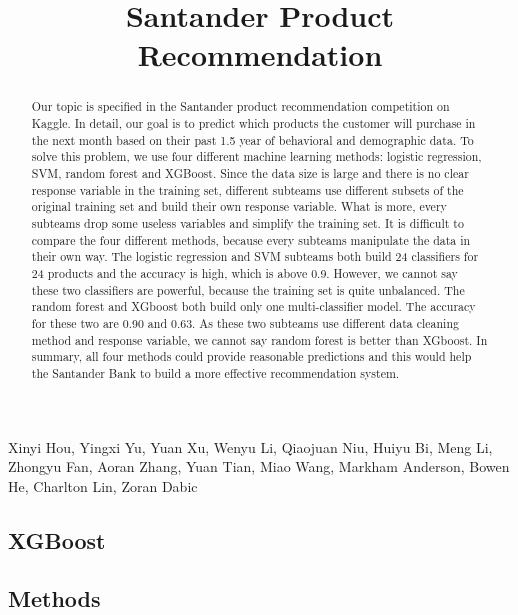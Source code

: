 \documentclass{article}
\title{Santander Product Recommendation}
\begin{document}
	\maketitle
	\begin{center}\begin{Large} Xinyi Hou,
			Yingxi Yu,
			Yuan Xu,
			Wenyu Li,
			Qiaojuan Niu,
			Huiyu Bi,
			Meng Li,
			Zhongyu Fan,
			Aoran Zhang,
			Yuan Tian,
			Miao Wang,
			Markham Anderson,
			Bowen He,
			Charlton Lin,
			Zoran Dabic \end{Large}\end{center}
	\begin{spacing}{1}
		\begin{large}
			
\begin{abstract}
	 Our topic is specified in the Santander product recommendation competition on Kaggle. In detail, our goal is to predict which products the customer will purchase in the next month based on their past 1.5 year of behavioral and demographic data. To solve this problem, we use four different machine learning methods: logistic regression, SVM, random forest and XGBoost. Since the data size is large and there is no clear response variable in the training set, different subteams use different subsets of the original training set and build their own response variable. What is more, every subteams drop some useless variables and simplify the training set. It is difficult to compare the four different methods, because every subteams manipulate the data in their own way. The logistic regression and SVM subteams both build 24 classifiers for 24 products and the accuracy is high, which is above 0.9. However, we cannot say these two classifiers are powerful, because the training set is quite unbalanced. The random forest and XGboost both build only one multi-classifier model. The accuracy for these two are 0.90 and 0.63. As these two subteams use different data cleaning method and response variable, we cannot say random forest is better than XGboost. In summary, all four methods could provide reasonable predictions and this would help the Santander Bank to build a more effective recommendation system.
\end{abstract}

\section{XGBoost}

\subsection{Methods}


\end{large}
\end{spacing}
\end{document}
